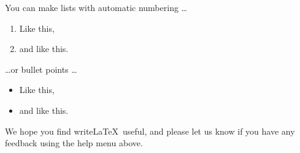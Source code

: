You can make lists with automatic numbering \dots

\begin{enumerate}
\item Like this,
\item and like this.
\end{enumerate}
\dots or bullet points \dots
\begin{itemize}
\item Like this,
\item and like this.
\end{itemize}

We hope you find write\LaTeX\ useful, and please let us know if you have any feedback using the help menu above.

